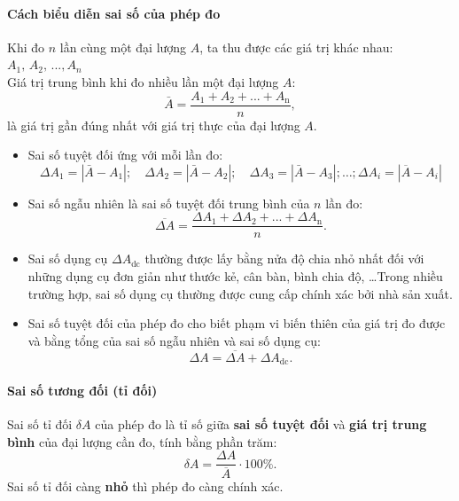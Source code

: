 \begin{tomtat}
	\paragraph{Cách biểu diễn sai số của phép đo}
	Khi đo $n$ lần cùng một đại lượng $A$, ta thu được các giá trị khác nhau: $A_1,\, A_2,\,...,A_n$\\
	Giá trị trung bình khi đo nhiều lần một đại lượng $A$:$$\bar{A}=\dfrac{A_1+A_2+...+A_{\text{n}}}{n},$$
	là giá trị gần đúng nhất với giá trị thực của đại lượng $A$.  
	\begin{itemize}
		\item Sai số tuyệt đối ứng với mỗi lần đo:
		$$\Delta A_1=|\bar{A}-A_1|;\quad\Delta A_2=|\bar{A}-A_2|;\quad\Delta A_3=|\bar{A}-A_3|;\dots; \Delta A_i=\left|\overline{A}-A_i\right|$$
		\item Sai số ngẫu nhiên là sai số tuyệt đối trung bình của $n$ lần đo:
		$$\overline{\Delta A}=\dfrac{\Delta A_1+\Delta A_2+...+\Delta A_{\textrm{n}} }{n}.$$
		\item Sai số dụng cụ $\Delta A_\text{dc}$ thường được lấy bằng nửa độ chia nhỏ nhất đối với những dụng cụ đơn giản như thước kẻ, cân bàn, bình chia độ, \dots Trong nhiều trường hợp, sai số dụng cụ thường được cung cấp chính xác bởi nhà sản xuất.
		\item Sai số tuyệt đối của phép đo cho biết phạm vi biến thiên của giá trị đo được và bằng tổng của sai số ngẫu nhiên và sai số dụng cụ:
		$$\Delta A= \overline{\Delta A}+ \Delta A_\text{dc}.$$
	\end{itemize}
	\paragraph{Sai số tương đối (tỉ đối)}
	Sai số tỉ đối $\delta A$ của phép đo là tỉ số giữa \textbf{sai số tuyệt đối} và \textbf{giá trị trung bình} của đại lượng cần đo, tính bằng phần trăm:
	$$\delta A=\dfrac{\Delta A}{\overline A}\cdot 100\%.$$
	Sai số tỉ đối càng \textbf{nhỏ} thì phép đo càng chính xác.

\end{tomtat}
